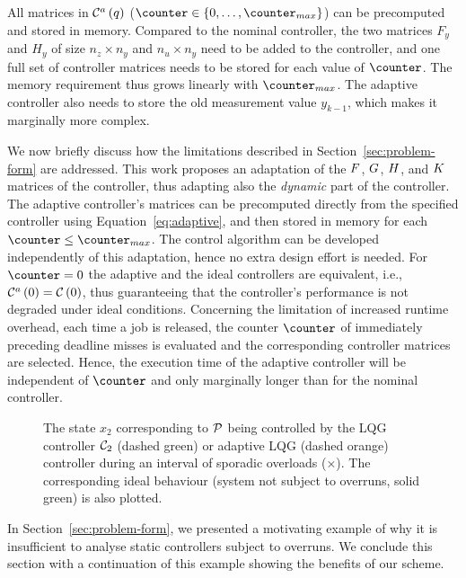 All matrices in $\mathcal{C}^a\left( q \right)$ ($\counter \in \{0, \ldots, \counter_{max}\}$) can be precomputed and stored in memory.
Compared to the nominal controller, the two matrices $F_y$ and $H_y$ of size $n_z \times n_y$ and $n_u \times n_y$ need to be added to the controller, and one full set of controller matrices needs to be stored for each value of $\counter$.
The memory requirement thus grows linearly with $\counter_{max}$.
The adaptive controller also needs to store the old measurement value $y_{k-1}$, which makes it marginally more complex.

We now briefly discuss how the limitations described in Section~\ref{sec:problem-form} are addressed.
This work proposes an adaptation of the $F$, $G$, $H$, and $K$ matrices of the controller, thus adapting also the \emph{dynamic} part of the controller.
The adaptive controller's matrices can be precomputed directly from the specified controller using Equation~\eqref{eq:adaptive}, and then stored in memory for each $\counter \leq \counter_{max}$.
The control algorithm can be developed independently of this adaptation, hence no extra design effort is needed.
For $\counter=0$ the adaptive and the ideal controllers are equivalent, i.e., $\mathcal{C}^a\left( 0 \right) = \mathcal{C}\left( 0 \right)$, thus guaranteeing that the controller's performance is not degraded under ideal conditions.
Concerning the limitation of increased runtime overhead, each time a job is released, the counter $\counter$ of immediately preceding deadline misses is evaluated and the corresponding controller matrices are selected.
Hence, the execution time of the adaptive controller will be independent of $\counter$ and only marginally longer than for the nominal controller.

\begin{figure}[tp!]
    \centerline{}
    \caption{The state $x_2$ corresponding to $\mathcal{P}$ being controlled by the LQG controller $\mathcal{C}_2$ (dashed green) or adaptive LQG (dashed orange) controller during an interval of sporadic overloads ($\times$).
    The corresponding ideal behaviour (system not subject to overruns, solid green) is also plotted.}
    \label{fig:lqgs-lqgd}
\end{figure}

In Section~\ref{sec:problem-form}, we presented a motivating example of why it is insufficient to analyse static controllers subject to overruns.
We conclude this section with a continuation of this example showing the benefits of our scheme.

